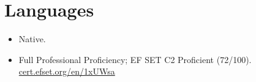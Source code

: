 \section{Languages}

\begin{itemize}
  \item {} Native.
  \item {} Full Professional Proficiency; EF SET C2 Proficient (72/100). \href{https://cert.efset.org/en/1xUWsa}{cert.efset.org/en/1xUWsa}
\end{itemize}
